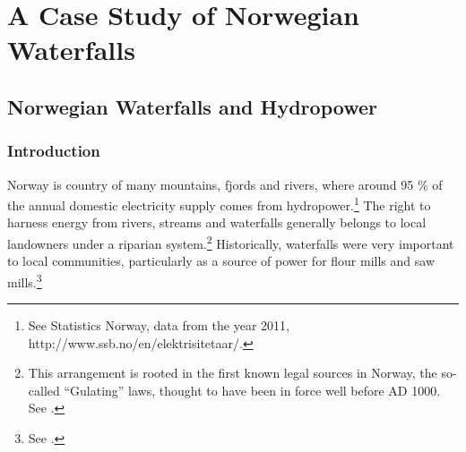 \part{A Case Study of Norwegian Waterfalls}

\chapter{Norwegian Waterfalls and Hydropower}\label{chap:4}

\section{Introduction}\label{sec:4:1}

Norway is country of many mountains, fjords and rivers, where around 95 \% of the annual domestic electricity supply comes from hydropower.\footnote{See Statistics Norway, data from the year 2011, http://www.ssb.no/en/elektrisitetaar/.} The right to harness energy from rivers, streams and waterfalls generally belongs to local landowners under a riparian system.\footnote{This arrangement is rooted in the first known legal sources in Norway, the so-called ``Gulating'' laws, thought to have been in force well before AD 1000. See \cite[111-112,120]{robberstad81}.}  Historically, waterfalls were very important to local communities, particularly as a source of power for flour mills and saw mills.\footnote{See \cite[121]{tvedt13}.} %

